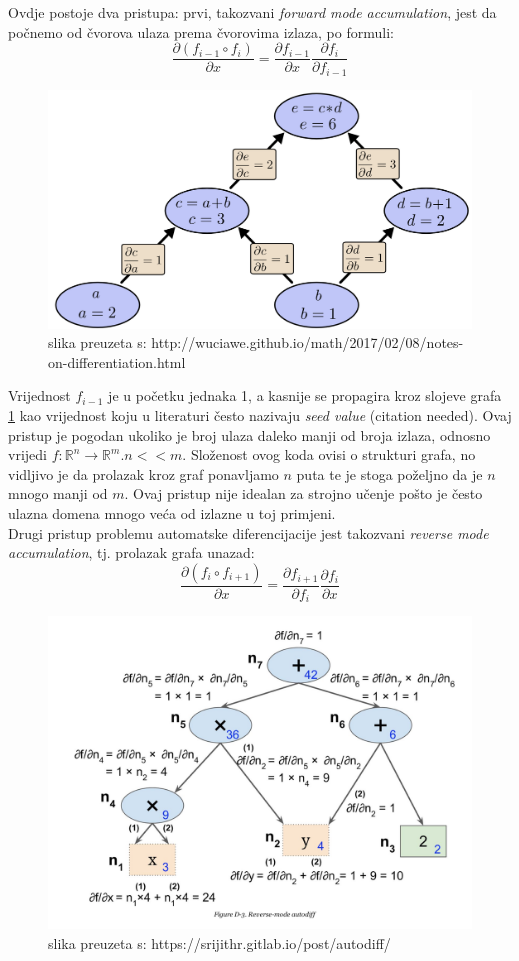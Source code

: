 \documentclass[zavrsnirad]{fer}
\begin{document}
Ovdje postoje dva pristupa: prvi, takozvani \textit{forward mode accumulation}, jest da počnemo od čvorova ulaza prema čvorovima izlaza, po formuli:
\begin{equation}
  \frac{\partial (f_{i-1} \circ f_i)}{\partial x} = \frac{\partial f_{i-1}}{\partial x} \frac{\partial f_i}{\partial f_{i-1}}
\end{equation}
\begin{figure}[h]
  \centering
  \includegraphics[width=0.7\linewidth]{"./slike/forward_graph.png"}
  \caption{slika preuzeta s: http://wuciawe.github.io/math/2017/02/08/notes-on-differentiation.html}
  \label{slk:forward_graph}
\end{figure}
Vrijednost $f_{i-1}$ je u početku jednaka 1, a kasnije se propagira kroz slojeve grafa \ref{slk:forward_graph} kao vrijednost koju u literaturi često nazivaju \textit{seed value} (citation needed). Ovaj pristup je pogodan ukoliko je broj ulaza daleko manji od broja izlaza, odnosno vrijedi $f: \mathbb{R}^n \rightarrow \mathbb{R}^m. n << m$. Složenost ovog koda ovisi o strukturi grafa, no vidljivo je da prolazak kroz graf ponavljamo $n$ puta te je stoga poželjno da je $n$ mnogo manji od $m$. Ovaj pristup nije idealan za strojno učenje pošto je često ulazna domena mnogo veća od izlazne u toj primjeni.
\\
Drugi pristup problemu automatske diferencijacije jest takozvani \textit{reverse mode accumulation}, tj. prolazak grafa unazad:
\begin{equation}
  \frac{\partial (f_i \circ f_{i+1})}{\partial x} = \frac{\partial f_{i+1}}{\partial f_i} \frac{\partial f_i}{\partial x}
\end{equation}
\begin{figure}[h]
  \centering
  \includegraphics[width=0.7\linewidth]{"./slike/reverse_graph.png"}
  \caption{slika preuzeta s: https://srijithr.gitlab.io/post/autodiff/}
  \label{slk:reverse_graf}
\end{figure}
\end{document}
